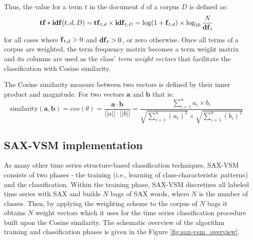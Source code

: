 Thus, the \tfidf value for a term $\textit{t}$ in the document 
$\textit{d}$ of a corpus $\textit{D}$ is defined as:
\begin{equation}
 \text{\textbf{tf}} \ast \text{\textbf{idf}}(t, d, D) =  \text{\textbf{tf}}_{t, d} \times \text{\textbf{idf}}_{t, D} = \log(1 + \text{\textbf{f}}_{t,d})
\times \log_{10}\frac{N}{\mbox{\textbf{df}}_{t}}
 \label{formula:tfidf}
\end{equation} 
for all cases where $\mbox{\textbf{f}}_{t,d}>0$ and $\mbox{\textbf{df}}_{t}>0$, or zero otherwise.
Once all terms of a corpus are weighted, the term frequency matrix becomes a term weight matrix and its columns 
are used as the class' \textit{term weight vectors} that facilitate the classification with Cosine similarity. 

The Cosine similarity measure between two vectors is defined by their inner product and magnitude. 
For two vectors $\mathbf{a}$ and $\mathbf{b}$ that is:
\begin{equation}
\mbox{similarity}(\mathbf{a},\mathbf{b}) = cos(\theta) = 
\frac{ \mathbf{a} \cdot \mathbf{b} } {\left| \left| a \right| \right| \cdot \left| \left| b \right|\right|} =
\frac{ \sum\limits_{i=1}^{n}{a_{i} \times b_{i}} }{ \sqrt{\sum\limits_{i=1}^{n}{(a_{i})^2}} \times \sqrt{\sum\limits_{i=1}^{n}{(b_{i})^2}}}
\label{eq:cosine_similarity}
\end{equation} 

\subsection{SAX-VSM implementation} \label{sax-vsm}
As many other time series structure-based classification techniques, SAX-VSM consists of two 
phases - the training (i.e., learning of class-characteristic patterns) and the classification. 
Within the training phase, SAX-VSM discretizes all labeled time series with SAX and builds $N$ bags 
of SAX words, where $N$ is the number of classes. 
Then, by applying the \tfidf weighting scheme to the corpus of $N$ bags it obtains $N$ weight vectors 
which it uses for the time series classification procedure built upon the Cosine similarity. 
The schematic overview of the algorithm training and classification phases is given in the Figure \ref{fig:sax-vsm_overview}.

